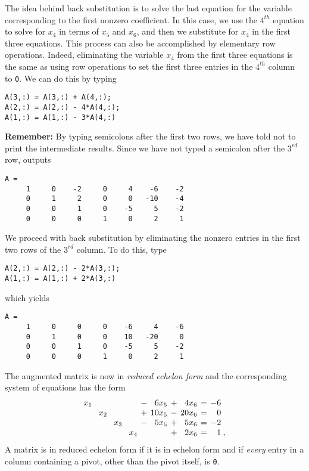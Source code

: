 \documentclass{ximera}
\begin{document}
The idea behind back substitution  is
to solve the last equation for the variable corresponding to the
first nonzero coefficient.  In this case, we use the $4^{th}$
equation to solve for $x_4$ in terms of $x_5$ and $x_6$, and
then we substitute for $x_4$ in the first three equations.  This
process can also be accomplished by elementary row operations.
Indeed, eliminating the variable $x_4$ from the first three
equations is the same as using row operations to set the first
three entries in the $4^{th}$ column to {\tt 0}.  We can do this
by typing
\begin{verbatim}
A(3,:) = A(3,:) + A(4,:);
A(2,:) = A(2,:) - 4*A(4,:);
A(1,:) = A(1,:) - 3*A(4,:)
\end{verbatim}
{\bf Remember:} By typing semicolons after the first two rows, we
have told \Matlab not to print the intermediate results.  Since
we have not typed a semicolon after the $3^{rd}$ row, \Matlab
outputs
\begin{verbatim}
A =
     1     0    -2     0     4    -6    -2
     0     1     2     0     0   -10    -4
     0     0     1     0    -5     5    -2
     0     0     0     1     0     2     1
\end{verbatim}
We proceed with back substitution by eliminating the nonzero
entries in the first two rows of the $3^{rd}$ column.  To do
this, type
\begin{verbatim}
A(2,:) = A(2,:) - 2*A(3,:);
A(1,:) = A(1,:) + 2*A(3,:)
\end{verbatim}
which yields
\begin{verbatim}
A =
     1     0     0     0    -6     4    -6
     0     1     0     0    10   -20     0
     0     0     1     0    -5     5    -2
     0     0     0     1     0     2     1
\end{verbatim}
The augmented matrix is now in {\em reduced echelon form}
 and the corresponding system of
equations has the form
\begin{equation}   \label{e:refexamp5}
\arraycolsep 2pt
\begin{array}{rcrcrcrcrcrcrl}
  x_1 &   &     &   &     &  &     & - &  6x_5 & + &  4x_6 & = &
-6 & \\
      &   & x_2 &   &     &  &     & + & 10x_5 & - & 20x_6 & = &
0 & \\
      &   &     &   & x_3 &  &     & - &  5x_5 & + &  5x_6 & = &
-2 & \\
      &   &     &   &     &  & x_4 &   &       & + &  2x_6 & = &
1 &\! ,
\end{array}
\end{equation}
A matrix is in reduced echelon form 
if it is in echelon form and if {\em every\/} entry in a column
containing a pivot, other than the pivot itself, is {\tt 0}.
\end{document}
